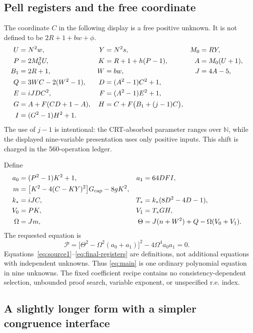 \documentclass[11pt]{article}
\newcommand{\N}{\mathbb N}
\newcommand{\Gcap}{G_{\mathrm{cap}}}
\theoremstyle{remark}\newtheorem{remark}[theorem]{Remark}
\begin{document}
\subsection{Pell registers and the free coordinate}

The coordinate $C$ in the following display is a free positive unknown.
It is not defined to be $2R+1+bw+\phi$.
\begin{align}
 U&=N^2w,&Y&=N^2s,&M_0&=RY,\notag\\
 P&=2M_0^2U,&K&=R+1+h(P-1),&A&=M_0(U+1),\notag\\
 B_1&=2R+1,&W&=bw,&J&=4A-5,\notag\\
 Q&=3WC-2(W^2-1),&D&=(A^2-1)C^2+1,\notag\\
 E&=iJDC^2,&F&=(A^2-1)E^2+1,\notag\\
 G&=A+F(CD+1-A),&
 H&=C+F\bigl(B_1+(j-1)C\bigr),\notag\\
 I&=(G^2-1)H^2+1.\label{eq:pell}
\end{align}
The use of $j-1$ is intentional: the CRT-absorbed parameter ranges over
$\N$, while the displayed nine-variable presentation uses only positive
inputs. This shift is charged in the 560-operation ledger.

Define
\begin{align}
 a_0&=(P^2-1)K^2+1,&a_1&=64DFI,\notag\\
 m&=\bigl[K^2-4(C-KY)^2\bigr]\Gcap-8gK^2,\notag\\
 k_*&=iJC,&T_*&=k_*(8D^2-4D-1),\notag\\
 V_0&=PK,&V_1&=T_*GH,\notag\\
 \Omega&=Jm,&
 \Theta&=J(n+W^2)+Q-\Omega(V_0+V_1).\label{eq:final-registers}
\end{align}
The requested equation is
\begin{equation}\label{eq:main}
 \boxed{\qquad
 \mathcal P
  =\bigl[\Theta^2-\Omega^2(a_0+a_1)\bigr]^2
       -4\Omega^4a_0a_1=0.
 \qquad}
\end{equation}
Equations~\eqref{eq:source1}--\eqref{eq:final-registers} are definitions,
not additional equations with independent unknowns. Thus
\eqref{eq:main} is one ordinary polynomial equation in nine unknowns.
The fixed coefficient recipe contains no consistency-dependent selection,
unbounded proof search, variable exponent, or unspecified r.e. index.

\subsection{A slightly longer form with a simpler congruence interface}
\end{document}
